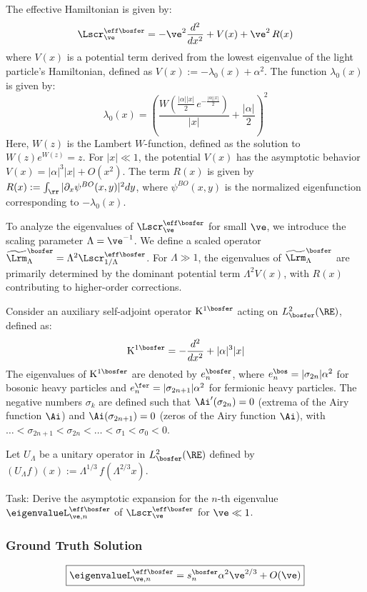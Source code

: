 \documentclass[10pt]{article}
\begin{document}
The effective Hamiltonian is given by:
$$
\Lscr^{\eff\bosfer}_\ve = -\ve^2 \frac{d^2}{dx^2}+ V(x) + \ve^2 \,R(x)
$$
where $V(x)$ is a potential term derived from the lowest eigenvalue of the light particle's Hamiltonian, defined as $V(x) := -\lambda_0(x)+\alpha^2$. The function $\lambda_0(x)$ is given by:
$$
\lambda_0(x) = \left(\frac{ W\left(\frac{|\alpha||x|}{2} \,e^{-\frac{|\alpha||x|}{2}} \right)}{|x|} + \frac{|\alpha|}{2}\right)^{\!\!2}
$$
Here, $W(z)$ is the Lambert $W$-function, defined as the solution to $W(z)e^{W(z)} = z$. For $|x| \ll 1$, the potential $V(x)$ has the asymptotic behavior $V(x) = |\alpha|^3|x|+ O(x^2)$. The term $R(x)$ is given by $R(x) := \int_\rr |\partial_x \psi^{BO}(x,y)|^2 dy$, where $\psi^{BO}(x,y)$ is the normalized eigenfunction corresponding to $-\lambda_0(x)$.

To analyze the eigenvalues of $\Lscr^{\eff\bosfer}_\ve$ for small $\ve$, we introduce the scaling parameter $\Lambda = \ve^{-1}$. We define a scaled operator $\widetilde \Lrm_\Lambda^\bosfer = \Lambda^2 \Lscr^{\eff\bosfer}_{1/\Lambda }$. For $\Lambda \gg 1$, the eigenvalues of $\widetilde \Lrm_\Lambda^\bosfer$ are primarily determined by the dominant potential term $\Lambda^2 V(x)$, with $R(x)$ contributing to higher-order corrections.

Consider an auxiliary self-adjoint operator $\mathrm{K}^{1\bosfer}$ acting on $L^2_{\bosfer}(\RE)$, defined as:
$$
\mathrm{K}^{1\bosfer} = -\frac{d^2}{dx^2} + |\alpha|^3|x|
$$
The eigenvalues of $\mathrm{K}^{1\bosfer}$ are denoted by $e_n^{\bosfer}$, where $e_n^{\bos} = |\sigma_{2n}|\alpha^2$ for bosonic heavy particles and $e_n^{\fer} = |\sigma_{2n+1}|\alpha^2$ for fermionic heavy particles. The negative numbers $\sigma_k$ are defined such that $\Ai'(\sigma_{2n})=0$ (extrema of the Airy function $\Ai$) and $\Ai(\sigma_{2n+1})=0$ (zeros of the Airy function $\Ai$), with $\dots<\sigma_{2n+1}<\sigma_{2n}<\dots<\sigma_{1}<\sigma_{0}<0$.

Let $U_{\Lambda}$ be a unitary operator in $L^{2}_{\bosfer}(\RE)$ defined by $(U_{\Lambda}f)(x) := \Lambda^{1/3}\, f(\Lambda^{2/3} x)$.

Task:
Derive the asymptotic expansion for the $n$-th eigenvalue $\eigenvalueL^{\eff\bosfer}_{\ve, n}$ of $\Lscr^{\eff\bosfer}_\ve$ for $\ve \ll 1$.

\subsubsection*{Ground Truth Solution}
\[ \boxed{\eigenvalueL^{\eff\bosfer}_{\ve, n} = s^{\bosfer}_{n}\alpha^2 \ve^{2/3} + O (\ve)} \]
\end{document}

